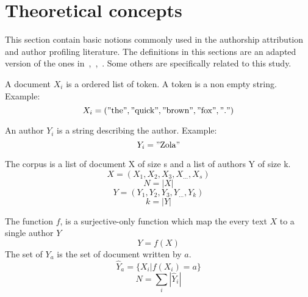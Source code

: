 \section{Theoretical concepts}

This section contain basic notions commonly used in the authorship attribution and author profiling literature.
The definitions in this sections are an adapted version of the ones in~\cite{savoy_stylo},~\cite{kocher_linking},~\cite{bcubed}.
Some others are specifically related to this study.


\begin{definition}[Document]
  A document $X_i$ is a ordered list of token. A token is a non empty string. Example:
  \begin{equation}
    X_i = ("\text{the}", "\text{quick}", "\text{brown}", "\text{fox}", "\text{.}")
  \end{equation}
\end{definition}

\begin{definition}[Author]
  An author $Y_i$ is a string describing the author. Example:
  \begin{equation}
    Y_i = "\text{Zola}"
  \end{equation}
\end{definition}

\begin{definition}[Corpus]
  The corpus is a list of document X of size s and a list of authors Y of size k.
  \begin{equation}
    X = (X_1, X_2, X_3, X_{...}, X_s)
  \end{equation}
  \begin{equation}
    N = |X|
  \end{equation}
  \begin{equation}
    Y = (Y_1, Y_2, Y_3, Y_{...}, Y_k)
  \end{equation}
  \begin{equation}
    k = |Y|
  \end{equation}
\end{definition}

\begin{definition}
  The function $f$, is a surjective-only function which map the every text $X$ to a single author $Y$
  \begin{equation}
    Y = f(X)
  \end{equation}
  The set of $Y_a$ is the set of document written by $a$.
  \begin{equation}
    \hat{Y}_a = \{X_i | f(X_i) = a\}
  \end{equation}
  \begin{equation}
    N = \sum_{i} |\hat{Y}_i|
  \end{equation}
\end{definition}

